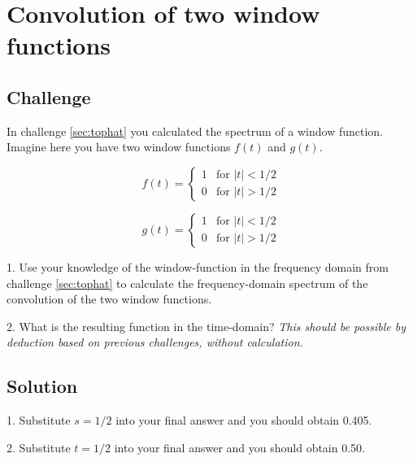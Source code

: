 \newpage
\section{Convolution of two window functions}

\subsection*{Challenge}

In challenge \ref{sec:tophat} you calculated the spectrum of a window function. Imagine here you have two window functions $f(t)$ and $g(t)$.

\begin{equation}
    f(t)=
    \begin{cases}
        1 & \text{for } |t| < 1/2 \\
        0 & \text{for } |t| > 1/2
    \end{cases}
\end{equation}

\begin{equation}
    g(t)=
    \begin{cases}
        1 & \text{for } |t| < 1/2 \\
        0 & \text{for } |t| > 1/2
    \end{cases}
\end{equation}

1. Use your knowledge of the window-function in the frequency domain from challenge \ref{sec:tophat} to calculate the frequency-domain spectrum of the convolution of the two window functions.

2. What is the resulting function in the time-domain? \emph{This should be possible by deduction based on previous challenges, without calculation.}

\subsection*{Solution}
1. Substitute $s=1/2$ into your final answer and you should obtain 0.405.

2. Substitute $t=1/2$ into your final answer and you should obtain 0.50.

